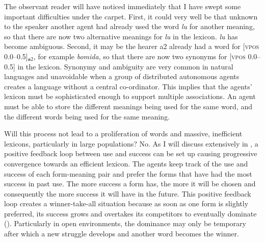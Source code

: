 The observant reader will have noticed immediately that 
I have swept some important difficulties under the carpet. 
First, it could very well be that unknown to the speaker 
another agent had already used the word \textit{lu} 
for another meaning, so that there are now 
two alternative meanings for \textit{lu} in the lexicon. \textit{lu} 
has become ambiguous. Second, it may be the hearer {\bfshape a2} already 
had a word for [\textsc{vpos} 0.0–0.5]$_{\mathbf  a2}$, for example \textit{bomida}, 
so that there are now two synonyms for [\textsc{vpos} 0.0–0.5] in the lexicon. 
Synonymy and ambiguity are very common in 
natural languages and unavoidable when a group of 
distributed autonomous agents creates a language without
a central co-ordinator. This implies that 
the agents' lexicon must be sophisticated enough 
to support multiple associations. An agent must be able to 
store the different meanings being used for the same word, and the 
different words being used for the same meaning. 

Will this process not lead to a proliferation of words and 
massive, inefficient lexicons, particularly in large
populations? No. As I will discuss extensively 
in , a positive feedback 
loop between use and success
can be set up causing progressive convergence towards an 
efficient lexicon. The agents keep track of the use and 
success of each form-meaning pair and prefer the forms that have had
the most success in past use. The more success a form has, the more
it will be chosen 
and consequently the more success it will have in the 
future. This positive feedback loop creates a winner-take-all 
situation because as soon as one form is slightly preferred, 
its success grows and overtakes its competitors
to eventually dominate (). Particularly 
in open environments, the dominance may only be temporary 
after which a new struggle develops and another word 
becomes the winner. 

